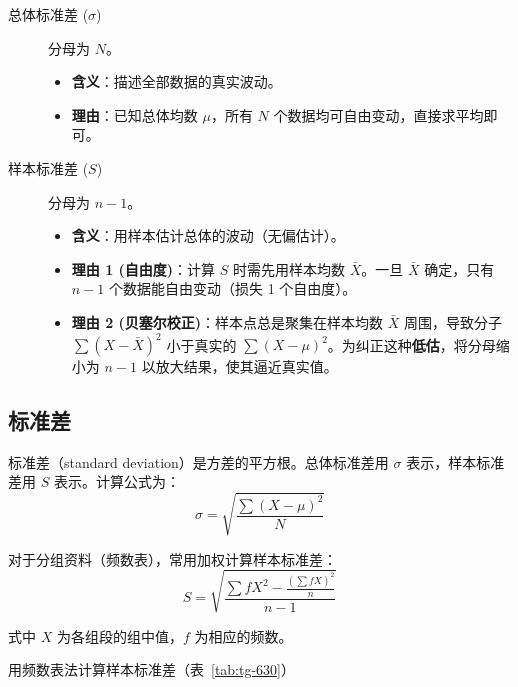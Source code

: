 \documentclass[lang=cn,10pt]{elegantbook}
\begin{document}
\begin{description}
    \item[总体标准差 ($\sigma$)] 分母为 $N$。
    \begin{itemize}
        \item \textbf{含义}：描述全部数据的真实波动。
        \item \textbf{理由}：已知总体均数 $\mu$，所有 $N$ 个数据均可自由变动，直接求平均即可。
    \end{itemize}
    
    \item[样本标准差 ($S$)] 分母为 $n-1$。
    \begin{itemize}
        \item \textbf{含义}：用样本估计总体的波动（无偏估计）。
        \item \textbf{理由 1 (自由度)}：计算 $S$ 时需先用样本均数 $\bar{X}$。一旦 $\bar{X}$ 确定，只有 $n-1$ 个数据能自由变动（损失 1 个自由度）。
        \item \textbf{理由 2 (贝塞尔校正)}：样本点总是聚集在样本均数 $\bar{X}$ 周围，导致分子 $\sum(X-\bar{X})^2$ 小于真实的 $\sum(X-\mu)^2$。为纠正这种\textbf{低估}，将分母缩小为 $n-1$ 以放大结果，使其逼近真实值。
    \end{itemize}
\end{description}

\subsection{标准差}

标准差（standard deviation）是方差的平方根。总体标准差用 $\sigma$ 表示，样本标准差用 $S$ 表示。计算公式为：
\begin{equation}
\sigma=\sqrt{\frac{\sum (X-\mu)^2}{N}}
\end{equation}

对于分组资料（频数表），常用加权计算样本标准差：
\begin{equation}
S=\sqrt{\frac{\sum fX^2-\frac{(\sum fX)^2}{n}}{n-1}}
\end{equation}

式中 $X$ 为各组段的组中值，$f$ 为相应的频数。

\vspace{0.2cm}

\begin{exercise}
    用频数表法计算样本标准差（表~\ref{tab:tg-630}）
\end{exercise}

\vspace{0.2cm}
\end{document}
